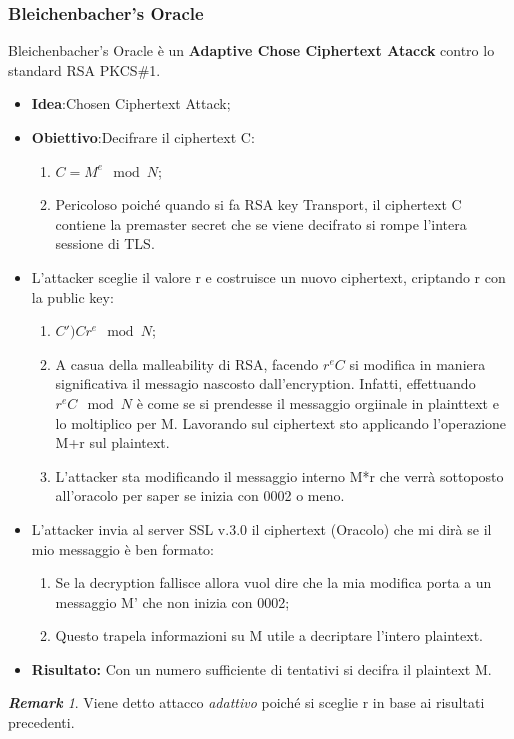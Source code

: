 \documentclass{book}
\theoremstyle{remark}
\newtheorem*{remark}{\textbf{Remark}}
\begin{document}
\subsubsection{Bleichenbacher's Oracle}
Bleichenbacher's Oracle è un \textbf{Adaptive Chose Ciphertext Atacck} contro lo standard RSA PKCS\#1\@.\begin{itemize}
	\item \textbf{Idea}:\@Effettuare Chosen Ciphertext Attack;\@
	\item \textbf{Obiettivo}:Decifrare il ciphertext C:\begin{enumerate}
		\item \(C=M^e\mod{N}\);\@
		\item Pericoloso poiché quando si fa RSA key Transport, il ciphertext C contiene la premaster secret che se viene decifrato si rompe l'intera sessione di TLS\@.
	\end{enumerate}
	\item L'attacker sceglie il valore r e costruisce un nuovo ciphertext, criptando r con la public key:\begin{enumerate}
		\item \(C')Cr^e\mod{N}\);\@
		\item A casua della malleability di RSA, facendo \(r^eC\) si modifica in maniera significativa il messagio nascosto dall'encryption\@. Infatti, effettuando \(r^eC\mod{N}\) è come se si prendesse il messaggio orgiinale in plainttext e lo moltiplico per M\@. Lavorando sul ciphertext sto applicando l'operazione M+r sul plaintext\@.
		\item L'attacker sta modificando il messaggio interno M*r che verrà sottoposto all'oracolo per saper se inizia con 0002 o meno\@.
	\end{enumerate}
	\item L'attacker invia al server SSL v\@.3\@.0 il ciphertext (Oracolo) che mi dirà se il mio messaggio è ben formato:\begin{enumerate}
		\item Se la decryption fallisce allora vuol dire che la mia modifica porta a un messaggio M' che non inizia con 0002;\@
		\item Questo trapela informazioni su M utile a decriptare l'intero plaintext\@.
	\end{enumerate}
	\item \textbf{Risultato:} Con un numero sufficiente di tentativi si decifra il plaintext M\@.
\end{itemize}
\begin{remark}
	Viene detto attacco \emph{adattivo} poiché si sceglie r in base ai risultati precedenti\@.
\end{remark}
\end{document}
